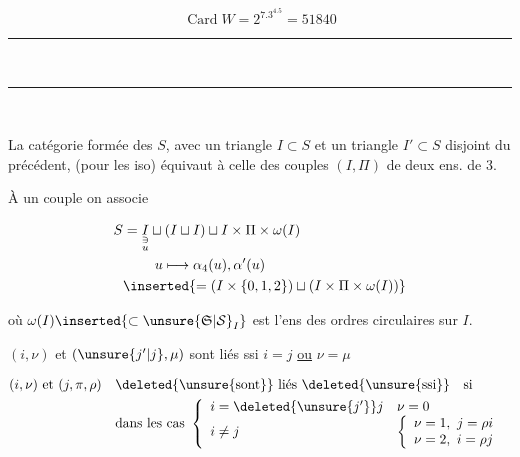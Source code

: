 \[
\operatorname{Card}W=2^7.3^4.5=51840
\]

\begin{center}\rule{1.15cm}{.35pt}\\[-1.2ex]\rule{.95cm}{.35pt}\end{center}

\\

La catégorie formée des $S$, avec un triangle $I\subset S$ et un triangle $I'\subset S$ disjoint du précédent, (pour les iso) équivaut à celle des couples $(I,\Pi)$ de deux ens. de  3.

À un  couple on associe

\[
\begin{aligned}
S&=\underset{\substack{\ni\\u}}{I}
\sqcup(I\sqcup I)\sqcup I\times\Pi\times\omega(I)\\
&\hspace{8mm}u\longmapsto\alpha_4(u),\alpha'(u)\\
&\inserted{=(I\times\{0,1,2\})\sqcup(I\times\Pi\times\omega(I))}
\end{aligned}
\]

où $\omega(I)\inserted{\subset\unsure{\mathfrak S|\mathcal S}_I}$ est l'ens  des ordres circulaires sur $I$.



$(i,\nu)$ et $(\unsure{j'|j},\mu)$  sont liés ssi $i=j$ \uline{ou} $\nu=\mu$

\[
\begin{aligned}
(i,\nu)\text{ et }(j,\pi,\rho)\quad &\deleted{\unsure{\text{sont}}}\ \text{liés }\deleted{\unsure{\text{ssi}}}\quad\text{si}\\
&\text{dans les cas }\left\{\begin{array}{ll}
i=\deleted{\unsure{j'}}j &\nu=0\\
i\ne j&\left\{\begin{array}{l}\nu=1,\ j=\rho i\\ \nu=2,\ i=\rho j\end{array}\right.
\end{array}\right.
\end{aligned}
\]

